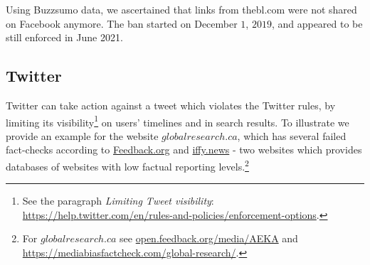 \documentclass{article}
\begin{document}
Using Buzzsumo data, we ascertained that links from thebl.com were not shared on Facebook anymore. The ban started on December $1$, $2019$, and appeared to be still enforced in June 2021.

\subsection{Twitter} 

Twitter can take action against a tweet which violates the Twitter rules, by limiting its visibility\footnote{See the paragraph {\it Limiting Tweet visibility}: \href{https://help.twitter.com/en/rules-and-policies/enforcement-options}{https://help.twitter.com/en/rules-and-policies/enforcement-options}.} on users' timelines and in search results. To illustrate we provide an example for the website $globalresearch.ca$, which has several failed fact-checks according to \href{https://open.feedback.org/media/AEKA}{Feedback.org} and \href{https://iffy.news}{iffy.news} - two websites which provides databases of websites with low factual reporting levels.\footnote{For $globalresearch.ca$ see \href{https://open.feedback.org/media/AEKA}{open.feedback.org/media/AEKA} and \href{https://mediabiasfactcheck.com/global-research/}{https://mediabiasfactcheck.com/global-research/}.}

\end{document}
